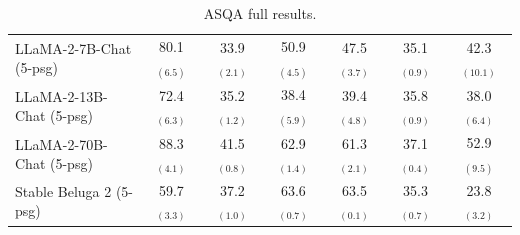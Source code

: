 \begin{table}[h]
\begin{tabular}{lcccccc}
            \midrule
            LLaMA-2-7B-Chat \vani{} (5-psg) & 80.1 $_{(6.5)}$ & 33.9 $_{(2.1)}$ & 50.9 $_{(4.5)}$ & 47.5 $_{(3.7)}$ & 35.1 $_{(0.9)}$ & 42.3 $_{(10.1)}$\\
            LLaMA-2-13B-Chat \vani{} (5-psg)  & 72.4 $_{(6.3)}$ & 35.2 $_{(1.2)}$ & 38.4 $_{(5.9)}$ & 39.4 $_{(4.8)}$ & 35.8 $_{(0.9)}$ & 38.0 $_{(6.4)}$\\
            LLaMA-2-70B-Chat \vani{} (5-psg)  & 88.3 $_{(4.1)}$ & 41.5 $_{(0.8)}$ & 62.9 $_{(1.4)}$ & 61.3 $_{(2.1)}$ & 37.1 $_{(0.4)}$ & 52.9 $_{(9.5)}$\\
            \midrule
            Stable Beluga 2 \vani{} (5-psg) & 59.7 $_{(3.3)}$&37.2 $_{(1.0)}$&63.6 $_{(0.7)}$&63.5 $_{(0.1)}$&35.3 $_{(0.7)}$&23.8 $_{(3.2)}$\\
            \bottomrule
        \end{tabular}
    \caption{
        ASQA full results. %
    }
    \label{tab:asqa_full}
\end{table}
